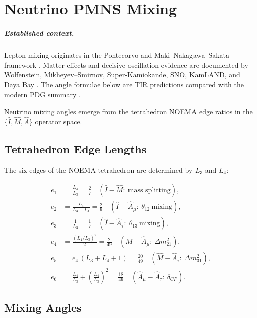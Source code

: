 \chapter{Neutrino PMNS Mixing}
\label{ch:pmns_mixing}


\paragraph{Established context.}
Lepton mixing originates in the Pontecorvo and Maki--Nakagawa--Sakata framework
\cite{Pontecorvo1957,Maki1962}.  Matter effects and decisive oscillation evidence
are documented by Wolfenstein, Mikheyev--Smirnov, Super-Kamiokande, SNO, KamLAND,
and Daya Bay
\cite{Wolfenstein1978,MikheyevSmirnov1985,SuperK1998,SNO2002,KamLAND2003,DayaBay2012}.
The angle formulae below are TIR predictions compared with the modern PDG summary
\cite{PDG2024}.

Neutrino mixing angles emerge from the tetrahedron NOEMA edge ratios in the
\(\{\hat I, \hat M, \hat A\}\) operator space.

\section{Tetrahedron Edge Lengths}

The six edges of the NOEMA tetrahedron are determined by \(L_3\) and
\(L_4\):

\[
\begin{aligned}
e_1 &= \frac{L_4}{L_3} = \frac{2}{7}
     \quad (\hat I-\hat M:\ \text{mass splitting}), \\[4pt]
e_2 &= \frac{L_4}{L_3+L_4} = \frac{2}{9}
     \quad (\hat I-\hat A_\mu:\ \theta_{12}\ \text{mixing}), \\[4pt]
e_3 &= \frac{1}{L_3} = \frac{1}{7}
     \quad (\hat I-\hat A_\tau:\ \theta_{13}\ \text{mixing}), \\[4pt]
e_4 &= \frac{(L_4/L_3)^2}{2} = \frac{2}{49}
     \quad (\hat M-\hat A_\mu:\ \Delta m_{21}^2), \\[4pt]
e_5 &= e_4\,(L_3+L_4+1) = \frac{20}{49}
     \quad (\hat M-\hat A_\tau:\ \Delta m_{31}^2), \\[4pt]
e_6 &= \frac{L_4}{L_3} + \left(\frac{L_4}{L_3}\right)^2 = \frac{18}{49}
     \quad (\hat A_\mu-\hat A_\tau:\ \delta_{CP}).
\end{aligned}
\]

\section{Mixing Angles}


